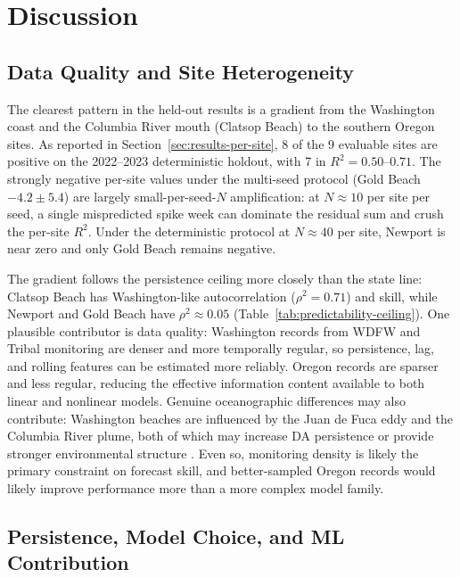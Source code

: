 \documentclass[toxins,article,submit,moreauthors]{Definitions/mdpi}
\begin{document}
\section{Discussion}
\label{sec:discussion}

\subsection{Data Quality and Site Heterogeneity}

The clearest pattern in the held-out results is a gradient from the Washington coast and the Columbia River mouth (Clatsop Beach) to the southern Oregon sites. As reported in Section~\ref{sec:results-per-site}, 8 of the 9 evaluable sites are positive on the 2022--2023 deterministic holdout, with 7 in $R^2 = 0.50$--$0.71$. The strongly negative per-site values under the multi-seed protocol (Gold Beach $-4.2 \pm 5.4$) are largely small-per-seed-$N$ amplification: at $N \approx 10$ per site per seed, a single mispredicted spike week can dominate the residual sum and crush the per-site $R^2$. Under the deterministic protocol at $N \approx 40$ per site, Newport is near zero and only Gold Beach remains negative.

The gradient follows the persistence ceiling more closely than the state line: Clatsop Beach has Washington-like autocorrelation ($\rho^2 = 0.71$) and skill, while Newport and Gold Beach have $\rho^2 \approx 0.05$ (Table~\ref{tab:predictability-ceiling}). One plausible contributor is data quality: Washington records from WDFW and Tribal monitoring are denser and more temporally regular, so persistence, lag, and rolling features can be estimated more reliably. Oregon records are sparser and less regular, reducing the effective information content available to both linear and nonlinear models. Genuine oceanographic differences may also contribute: Washington beaches are influenced by the Juan de Fuca eddy and the Columbia River plume, both of which may increase DA persistence or provide stronger environmental structure \cite{Trainer2009, McCabe2023}. Even so, monitoring density is likely the primary constraint on forecast skill, and better-sampled Oregon records would likely improve performance more than a more complex model family.

\subsection{Persistence, Model Choice, and ML Contribution}
\end{document}
